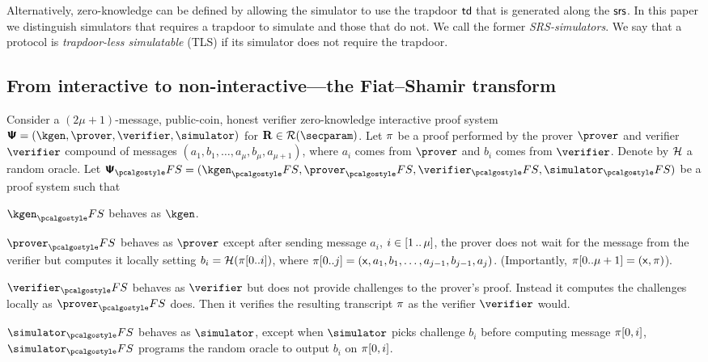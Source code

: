 Alternatively, zero-knowledge can be defined by allowing the simulator to use
the trapdoor $\mathsf{td}$ that is generated along the $\mathsf{srs}$. In this paper we distinguish
simulators that requires a trapdoor to simulate and those that do not. We call
the former \emph{SRS-simulators}. We say that a protocol is \emph{trapdoor-less simulatable} (TLS) if its simulator does not require the trapdoor.


\subsection{From interactive to non-interactive---the Fiat--Shamir transform}
Consider a $(2\mu + 1)$-message, public-coin, honest verifier zero-knowledge
interactive proof system
$\proofsystem = (\kgen, \prover, \verifier, \simulator)$ for
$\REL \in \RELGEN(\secparam)$.  Let $\pi$ be a proof performed by the
prover $\prover$ and verifier $\verifier$ compound of messages
$(a_1, b_1, \ldots, a_{\mu}, b_{\mu}, a_{\mu + 1})$, where $a_i$ comes from
$\prover$ and $b_i$ comes from $\verifier$.  Denote by $\mathcal{H}$ a random oracle.
Let $\proofsystem_\fs = (\kgen_\fs, \prover_\fs, \verifier_\fs, \simulator_\fs)$
be a proof system such that
\begin{compactitem}
  \item $\kgen_\fs$ behaves as $\kgen$.
  \item $\prover_\fs$ behaves as $\prover$ except after sending message
    $a_i$, $i \in [1 \, .. \, \mu]$, the prover does not wait for
    the message from the verifier but computes it locally setting $b_i
    = \mathcal{H}(\pi[0..i])$, where $\pi[0..j] = (\mathsf{x}, a_1, b_1, \ldots,
    a_{j - 1}, b_{j - 1}, a_j)$. (Importantly, $\pi[0..\mu + 1] =
    (\mathsf{x}, \pi)$).
  \item $\verifier_\fs$ behaves as $\verifier$ but does not provide
    challenges to the prover's proof. Instead it computes the
    challenges locally as $\prover_\fs$ does. Then it verifies the
    resulting transcript $\pi$ as the verifier $\verifier$ would. 
  \item $\simulator_\fs$ behaves as $\simulator$, except when
    $\simulator$ picks challenge $b_i$ before computing message $\pi[0, i]$, $\simulator_\fs$ programs the
    random oracle to output $b_i$ on $\pi[0, i]$.
  \end{compactitem}

